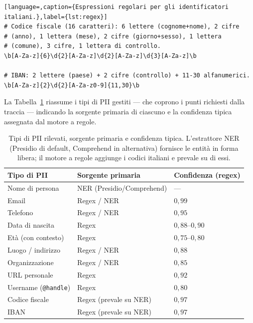 \documentclass[11pt,a4paper]{article}
\begin{document}
\begin{lstlisting}[language=,caption={Espressioni regolari per gli identificatori italiani.},label={lst:regex}]
# Codice fiscale (16 caratteri): 6 lettere (cognome+nome), 2 cifre
# (anno), 1 lettera (mese), 2 cifre (giorno+sesso), 1 lettera
# (comune), 3 cifre, 1 lettera di controllo.
\b[A-Za-z]{6}\d{2}[A-Za-z]\d{2}[A-Za-z]\d{3}[A-Za-z]\b

# IBAN: 2 lettere (paese) + 2 cifre (controllo) + 11-30 alfanumerici.
\b[A-Za-z]{2}\d{2}[A-Za-z0-9]{11,30}\b
\end{lstlisting}

La Tabella~\ref{tab:pii} riassume i tipi di PII gestiti --- che coprono i punti richiesti
dalla traccia --- indicando la sorgente primaria di ciascuno e la confidenza tipica
assegnata dal motore a regole.

\begin{table}[htbp]
\centering\footnotesize
\renewcommand{\arraystretch}{1.2}
\begin{tabular}{lll}
\toprule
\textbf{Tipo di PII} & \textbf{Sorgente primaria} & \textbf{Confidenza (regex)} \\
\midrule
Nome di persona            & NER (Presidio/Comprehend)     & --- \\
Email                      & Regex / NER                  & $0{,}99$ \\
Telefono                   & Regex / NER                  & $0{,}95$ \\
Data di nascita            & Regex                        & $0{,}88$--$0{,}90$ \\
Età (con contesto)         & Regex                        & $0{,}75$--$0{,}80$ \\
Luogo / indirizzo          & Regex / NER                  & $0{,}88$ \\
Organizzazione             & Regex / NER                  & $0{,}85$ \\
URL personale              & Regex                        & $0{,}92$ \\
Username (\texttt{@handle})& Regex                        & $0{,}80$ \\
Codice fiscale             & Regex (prevale su NER)       & $0{,}97$ \\
IBAN                       & Regex (prevale su NER)       & $0{,}97$ \\
\bottomrule
\end{tabular}
\caption{Tipi di PII rilevati, sorgente primaria e confidenza tipica. L'estrattore NER (Presidio di default, Comprehend in alternativa) fornisce le entità in forma libera; il motore a regole aggiunge i codici italiani e prevale su di essi.}
\label{tab:pii}
\end{table}
\end{document}
